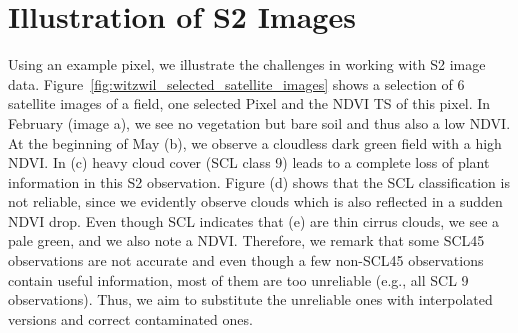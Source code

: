 		
\section{Illustration of S2 Images}{\label{sec:s2_challangges}
	
	Using an example pixel, we illustrate the challenges in working with S2 image data. Figure~\ref{fig:witzwil_selected_satellite_images} shows a selection of 6 satellite images of a field, one selected Pixel and the NDVI {TS} of this pixel. 		
	In February (image a), we see no vegetation but bare soil and thus also a low NDVI. At the beginning of May (b), we observe a cloudless dark green field with a high NDVI. In (c) heavy cloud cover (SCL class 9) leads to a complete loss of plant information in this S2 observation. Figure (d) shows that the SCL classification is not reliable, since we evidently observe clouds which is also reflected in a sudden NDVI drop. Even though SCL indicates that (e) are thin cirrus clouds, we see a pale green, and we also note a NDVI. Therefore, we remark that some SCL45 observations are not accurate and even though a few non-SCL45 observations contain useful information, most of them are too unreliable (e.g., all SCL 9 observations). Thus, we aim to substitute the unreliable ones with interpolated versions and correct contaminated ones.
		
}

